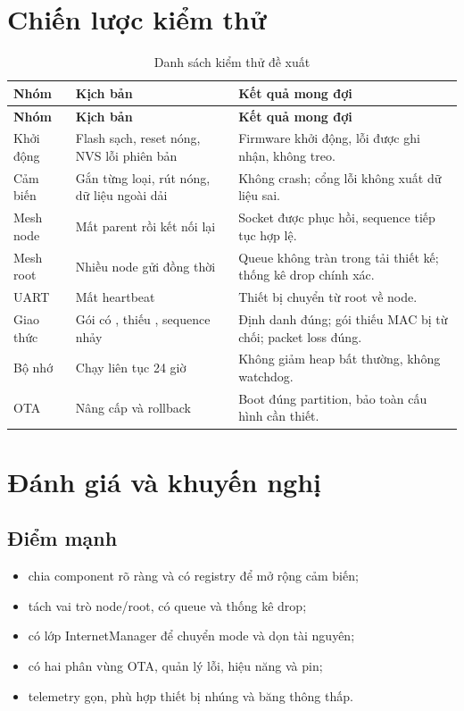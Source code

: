 \documentclass[a4paper]{article}
\newcommand{\codeword}[1]{\texttt{\detokenize{#1}}}
\begin{document}
\section{Chiến lược kiểm thử}

\begin{longtable}{p{3.8cm}p{6.2cm}p{4.2cm}}
  \caption{Danh sách kiểm thử đề xuất}\\
  \toprule
  \textbf{Nhóm} & \textbf{Kịch bản} & \textbf{Kết quả mong đợi} \\
  \midrule
  \endfirsthead
  \toprule
  \textbf{Nhóm} & \textbf{Kịch bản} & \textbf{Kết quả mong đợi} \\
  \midrule
  \endhead
  Khởi động & Flash sạch, reset nóng, NVS lỗi phiên bản & Firmware khởi động,
  lỗi được ghi nhận, không treo. \\
  Cảm biến & Gắn từng loại, rút nóng, dữ liệu ngoài dải & Không crash; cổng lỗi
  không xuất dữ liệu sai. \\
  Mesh node & Mất parent rồi kết nối lại & Socket được phục hồi, sequence tiếp
  tục hợp lệ. \\
  Mesh root & Nhiều node gửi đồng thời & Queue không tràn trong tải thiết kế;
  thống kê drop chính xác. \\
  UART & Mất heartbeat \codeword{Connected} & Thiết bị chuyển từ root về node. \\
  Giao thức & Gói có \codeword{M}, thiếu \codeword{M}, sequence nhảy &
  Định danh đúng; gói thiếu MAC bị từ chối; packet loss đúng. \\
  Bộ nhớ & Chạy liên tục 24 giờ & Không giảm heap bất thường, không watchdog. \\
  OTA & Nâng cấp và rollback & Boot đúng partition, bảo toàn cấu hình cần thiết. \\
  \bottomrule
\end{longtable}

\section{Đánh giá và khuyến nghị}

\subsection{Điểm mạnh}

\begin{itemize}
  \item chia component rõ ràng và có registry để mở rộng cảm biến;
  \item tách vai trò node/root, có queue và thống kê drop;
  \item có lớp InternetManager để chuyển mode và dọn tài nguyên;
  \item có hai phân vùng OTA, quản lý lỗi, hiệu năng và pin;
  \item telemetry gọn, phù hợp thiết bị nhúng và băng thông thấp.
\end{itemize}
\end{document}

